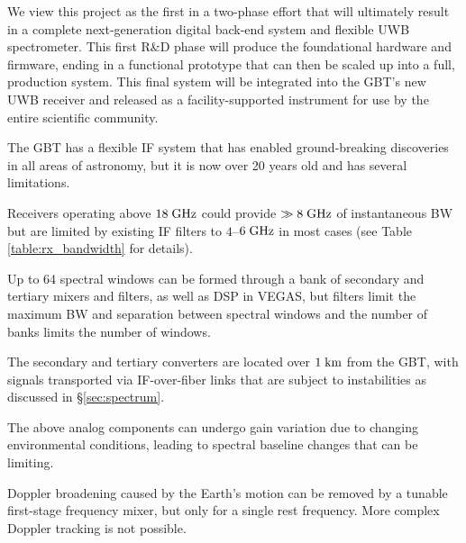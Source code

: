 \documentclass[10pt]{myNSF}
\begin{document}
\label{sec:phase_two}

We view this project as the first in a two-phase effort that will
ultimately result in a complete next-generation digital back-end
system and flexible UWB spectrometer.  This first R\&D phase will produce
the foundational hardware and firmware, ending in a functional
prototype that can then be scaled up into a full, production system.
This final system will be integrated into the GBT's new UWB receiver
and released as a facility-supported instrument for use by the entire
scientific community.

\label{sec:GBT_upgrades}

The GBT has a flexible IF system that has enabled ground-breaking
discoveries in all areas of astronomy, but it is now over 20 years old
and has several limitations.
\vspace{-1.0em}
\begin{itemize*}
\item{Receivers operating above $18\; \textrm{GHz}$ could provide $\gg 8\;
  \textrm{GHz}$ of instantaneous BW but are limited by existing IF filters to
  $4$--$6\; \textrm{GHz}$ in most cases (see Table \ref{table:rx_bandwidth}
  for details).}
\item{Up to 64 spectral windows can be formed through a bank of
  secondary and tertiary mixers and filters, as well as DSP in VEGAS,
  but filters limit the maximum BW and separation between spectral
  windows and the number of banks limits the number of windows.}
\item{The secondary and tertiary converters are located over $1\; \textrm{km}$
  from the GBT, with signals transported via IF-over-fiber links that
  are subject to instabilities as discussed in \S\ref{sec:spectrum}.}
\item{The above analog components can undergo gain variation due to
  changing environmental conditions, leading to spectral baseline
  changes that can be limiting.}
\item{Doppler broadening caused by the Earth's motion can be removed
  by a tunable first-stage frequency mixer, but only for a single rest
  frequency.  More complex Doppler tracking is not possible.}
\end{itemize*}
\vspace{-1.0em}
\end{document}
